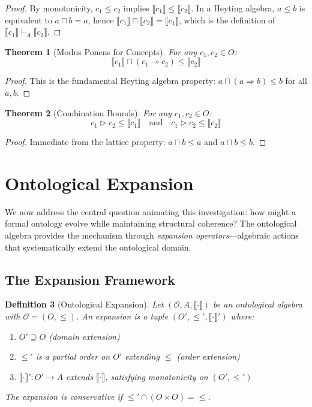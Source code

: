 \documentclass[11pt,a4paper]{article}
\newtheorem{definition}{Definition}[section]
\newtheorem{theorem}[definition]{Theorem}
\newcommand{\onto}{\mathcal{O}}
\newcommand{\sem}[1]{\llbracket #1 \rrbracket}
\begin{document}
\begin{proof}
By monotonicity, $c_1 \leq c_2$ implies $\sem{c_1} \leq \sem{c_2}$. In a Heyting algebra, $a \leq b$ is equivalent to $a \sqcap b = a$, hence $\sem{c_1} \sqcap \sem{c_2} = \sem{c_1}$, which is the definition of $\sem{c_1} \vdash_A \sem{c_2}$.
\end{proof}

\begin{theorem}[Modus Ponens for Concepts]
For any $c_1, c_2 \in O$:
$$
\sem{c_1} \sqcap (c_1 \multimap c_2) \leq \sem{c_2}
$$
\end{theorem}

\begin{proof}
This is the fundamental Heyting algebra property: $a \sqcap (a \Rightarrow b) \leq b$ for all $a, b$.
\end{proof}

\begin{theorem}[Combination Bounds]
For any $c_1, c_2 \in O$:
$$
c_1 \triangleright c_2 \leq \sem{c_1} \quad \text{and} \quad c_1 \triangleright c_2 \leq \sem{c_2}
$$
\end{theorem}

\begin{proof}
Immediate from the lattice property: $a \sqcap b \leq a$ and $a \sqcap b \leq b$.
\end{proof}

\section{Ontological Expansion}

We now address the central question animating this investigation: how might a formal ontology evolve while maintaining structural coherence? The ontological algebra provides the mechanism through \emph{expansion operators}---algebraic actions that systematically extend the ontological domain.

\subsection{The Expansion Framework}

\begin{definition}[Ontological Expansion]
Let $(\onto, A, \sem{\cdot})$ be an ontological algebra with $\onto = (O, \leq)$. An \emph{expansion} is a tuple $(O', \leq', \sem{\cdot}')$ where:
\begin{enumerate}
    \item $O' \supseteq O$ (domain extension)
    \item $\leq'$ is a partial order on $O'$ extending $\leq$ (order extension)
    \item $\sem{\cdot}' : O' \to A$ extends $\sem{\cdot}$, satisfying monotonicity on $(O', \leq')$
\end{enumerate}
The expansion is \emph{conservative} if $\leq' \cap (O \times O) = \leq$.
\end{definition}
\end{document}
